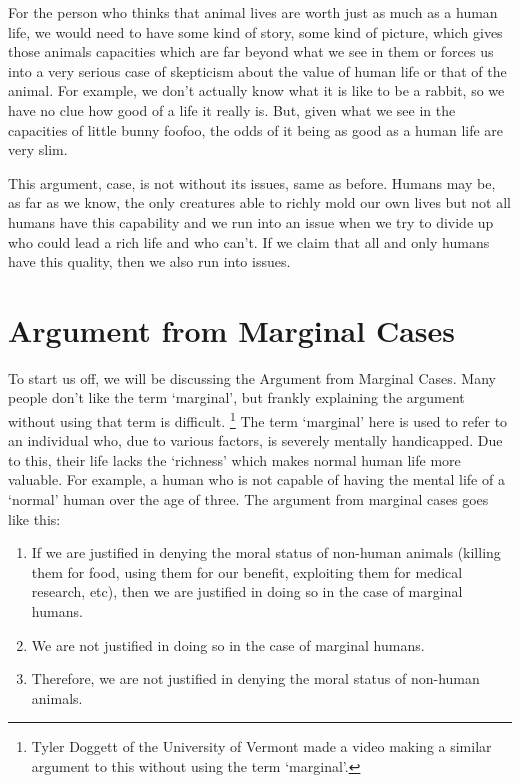For the person who thinks that animal lives are worth just as much as a human life, we would need to have some kind of story, some kind of picture, which gives those animals capacities which are far beyond what we see in them or forces us into a very serious case of skepticism about the value of human life or that of the animal. For example, we don’t actually know what it is like to be a rabbit, so we have no clue how good of a life it really is. But, given what we see in the capacities of little bunny foofoo, the odds of it being as good as a human life are very slim. 

This argument, case, is not without its issues, same as before. Humans may be, as far as we know, the only creatures able to richly mold our own lives but not all humans have this capability and we run into an issue when we try to divide up who could lead a rich life and who can't. If we claim that all and only humans have this quality, then we also run into issues.

\section{Argument from Marginal Cases}

To start us off, we will be discussing the Argument from Marginal Cases. Many people don't like the term `marginal', but frankly explaining the argument without using that term is difficult. \footnote{Tyler Doggett of the University of Vermont made a video making a similar argument to this without using the term `marginal'.\autocite{Doggett1}} The term `marginal' here is used to refer to an individual who, due to various factors, is severely mentally handicapped. Due to this, their life lacks the `richness' which makes normal human life more valuable. For example, a human who is not capable of having the mental life of a `normal' human over the age of three. The argument from marginal cases goes like this:

\begin{enumerate}
    \item If we are justified in denying the moral status of non-human animals (killing them for food, using them for our benefit, exploiting them for medical research, etc), then we are justified in doing so in the case of marginal humans.
    \item We are not justified in doing so in the case of marginal humans.
    \item Therefore, we are not justified in denying the moral status of non-human animals.
\end{enumerate}


